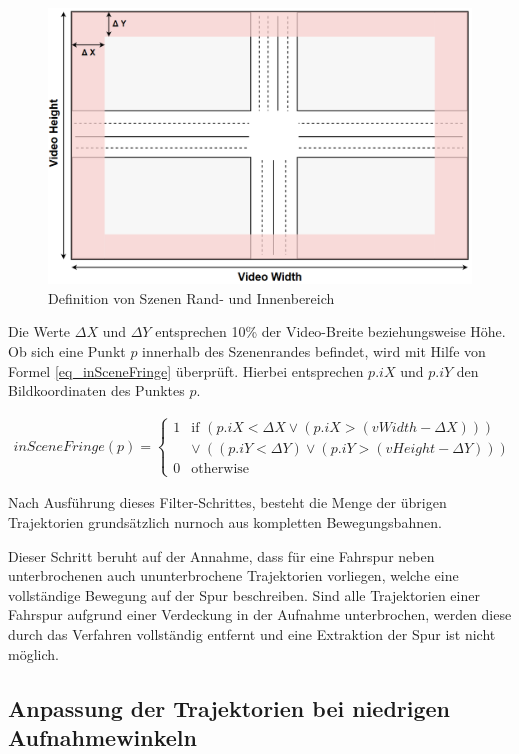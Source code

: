\begin{figure}[H]
\centering
    \includegraphics[width=0.5\linewidth]{resources/img/umsetzung/U1/LaneTopo_CompleteTra}
\caption{Definition von Szenen Rand- und Innenbereich}
\label{fig:real_completeTrajectory_Definition}
\end{figure}

Die Werte $\Delta X$ und $\Delta Y$ entsprechen 10\% der Video-Breite beziehungsweise Höhe.
Ob sich eine Punkt $p$ innerhalb des Szenenrandes befindet, wird mit Hilfe von Formel \ref{eq_inSceneFringe} überprüft.
Hierbei entsprechen $p.iX$ und $p.iY$ den Bildkoordinaten des Punktes $p$.

\begin{ceqn}
\begin{align}
\label{eq_inSceneFringe}
    inSceneFringe(p) =
    \begin{cases}
        1 & \text{if } (p.iX < \Delta X \lor (p.iX > (vWidth - \Delta X))) \\
          &            \lor\ ((p.iY < \Delta Y) \lor (p.iY > (vHeight - \Delta Y))) \\
        0 & \text{otherwise}
    \end{cases}
\end{align}
\end{ceqn}

Nach Ausführung dieses Filter-Schrittes, besteht die Menge der übrigen Trajektorien grundsätzlich nurnoch
aus kompletten Bewegungsbahnen.

Dieser Schritt beruht auf der Annahme, dass für eine Fahrspur neben unterbrochenen auch
ununterbrochene Trajektorien vorliegen, welche eine vollständige Bewegung auf der Spur beschreiben.
Sind alle Trajektorien einer Fahrspur aufgrund einer Verdeckung in der Aufnahme unterbrochen, werden
diese durch das Verfahren vollständig entfernt und eine Extraktion der Spur ist nicht möglich.

\subsection{Anpassung der Trajektorien bei niedrigen Aufnahmewinkeln}

